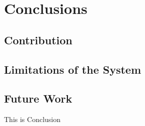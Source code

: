 \chapter{Conclusions}
\section{Contribution}
\section{Limitations of the System}
\section{Future Work}
This is Conclusion